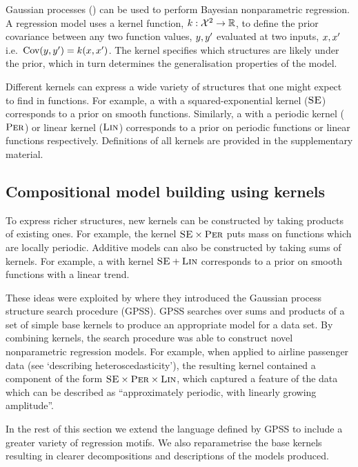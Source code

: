 \documentclass[letterpaper]{article}
\def\ie{i.e.\ }
\begin{document}
Gaussian processes (\gp{}) \citep{rasmussen38gaussian} can be used to perform Bayesian nonparametric regression.
A \gp{} regression model uses a kernel function, ${k : \mathcal{X}^2 \to \mathbb{R}}$, to define the prior covariance between any two function values, $y, y'$ evaluated at two inputs, $x,x'$ \ie ${\textrm{Cov}(y, y') = k(x,x')}$.
The kernel specifies which structures are likely under the \gp{} prior, which in turn determines the generalisation properties of the model.

Different kernels can express a wide variety of structures that one might expect to find in functions.
For example, a \gp{} with a squared-exponential kernel (${\textsc{SE}}$) corresponds to a prior on smooth functions.
Similarly, a \gp{} with a periodic kernel (${\textsc{Per}}$) or linear kernel (${\textsc{Lin}}$) corresponds to a prior on periodic functions or linear functions respectively.
Definitions of all kernels are provided in the supplementary material.

\subsection{Compositional model building using kernels}

To express richer structures, new kernels can be constructed by taking products of existing ones.
For example, the kernel ${\textsc{SE}} \times {\textsc{Per}}$ puts mass on functions which are locally periodic.
Additive models can also be constructed by taking sums of kernels.
For example, a \gp{} with kernel ${\textsc{SE}} + {\textsc{Lin}}$ corresponds to a prior on smooth functions with a linear trend.

These ideas were exploited by \citet{DuvLloGroetal13} where they introduced the Gaussian process structure search procedure (GPSS).
GPSS searches over sums and products of a set of simple base kernels to produce an appropriate model for a data set.
By combining kernels, the search procedure was able to construct novel nonparametric regression models.
For example, when applied to airline passenger data (see `describing heteroscedasticity'), the resulting kernel contained a component of the form ${\textsc{SE}} \times {\textsc{Per}} \times {\textsc{Lin}}$, which captured a feature of the data which can be described as ``approximately periodic, with linearly growing amplitude''.

In the rest of this section we extend the language defined by GPSS to include a greater variety of regression motifs.
We also reparametrise the base kernels resulting in clearer decompositions and descriptions of the models produced.
\end{document}
